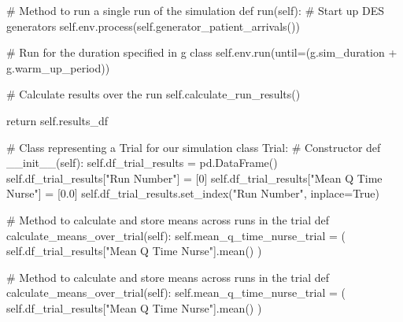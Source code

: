 \documentclass[
  letterpaper,
  DIV=11,
  numbers=noendperiod]{scrreprt}
\newenvironment{Shaded}{}{}
\newcommand{\CommentTok}[1]{\textcolor[rgb]{0.42,0.45,0.49}{#1}}
\newcommand{\ControlFlowTok}[1]{\textcolor[rgb]{0.84,0.23,0.29}{#1}}
\newcommand{\DecValTok}[1]{\textcolor[rgb]{0.00,0.36,0.77}{#1}}
\newcommand{\FloatTok}[1]{\textcolor[rgb]{0.00,0.36,0.77}{#1}}
\newcommand{\FunctionTok}[1]{\textcolor[rgb]{0.44,0.26,0.76}{#1}}
\newcommand{\KeywordTok}[1]{\textcolor[rgb]{0.84,0.23,0.29}{#1}}
\newcommand{\NormalTok}[1]{\textcolor[rgb]{0.14,0.16,0.18}{#1}}
\newcommand{\OperatorTok}[1]{\textcolor[rgb]{0.14,0.16,0.18}{#1}}
\newcommand{\StringTok}[1]{\textcolor[rgb]{0.01,0.18,0.38}{#1}}
\newcommand{\VariableTok}[1]{\textcolor[rgb]{0.89,0.38,0.04}{#1}}
\begin{document}
\begin{tcolorbox}
\begin{Shaded}
\begin{Highlighting}[]
    \CommentTok{\# Method to run a single run of the simulation}
    \KeywordTok{def}\NormalTok{ run(}\VariableTok{self}\NormalTok{):}
        \CommentTok{\# Start up DES generators}
        \VariableTok{self}\NormalTok{.env.process(}\VariableTok{self}\NormalTok{.generator\_patient\_arrivals())}

        \CommentTok{\# Run for the duration specified in g class}
        \VariableTok{self}\NormalTok{.env.run(until}\OperatorTok{=}\NormalTok{(g.sim\_duration }\OperatorTok{+}\NormalTok{ g.warm\_up\_period))}

        \CommentTok{\# Calculate results over the run}
        \VariableTok{self}\NormalTok{.calculate\_run\_results()}

        \ControlFlowTok{return} \VariableTok{self}\NormalTok{.results\_df}

\CommentTok{\# Class representing a Trial for our simulation}
\KeywordTok{class}\NormalTok{ Trial:}
    \CommentTok{\# Constructor}
    \KeywordTok{def}  \FunctionTok{\_\_init\_\_}\NormalTok{(}\VariableTok{self}\NormalTok{):}
        \VariableTok{self}\NormalTok{.df\_trial\_results }\OperatorTok{=}\NormalTok{ pd.DataFrame()}
        \VariableTok{self}\NormalTok{.df\_trial\_results[}\StringTok{"Run Number"}\NormalTok{] }\OperatorTok{=}\NormalTok{ [}\DecValTok{0}\NormalTok{]}
        \VariableTok{self}\NormalTok{.df\_trial\_results[}\StringTok{"Mean Q Time Nurse"}\NormalTok{] }\OperatorTok{=}\NormalTok{ [}\FloatTok{0.0}\NormalTok{]}
        \VariableTok{self}\NormalTok{.df\_trial\_results.set\_index(}\StringTok{"Run Number"}\NormalTok{, inplace}\OperatorTok{=}\VariableTok{True}\NormalTok{)}

    \CommentTok{\# Method to calculate and store means across runs in the trial}
    \KeywordTok{def}\NormalTok{ calculate\_means\_over\_trial(}\VariableTok{self}\NormalTok{):}
        \VariableTok{self}\NormalTok{.mean\_q\_time\_nurse\_trial }\OperatorTok{=}\NormalTok{ (}
            \VariableTok{self}\NormalTok{.df\_trial\_results[}\StringTok{"Mean Q Time Nurse"}\NormalTok{].mean()}
\NormalTok{        )}

    \CommentTok{\# Method to calculate and store means across runs in the trial}
    \KeywordTok{def}\NormalTok{ calculate\_means\_over\_trial(}\VariableTok{self}\NormalTok{):}
        \VariableTok{self}\NormalTok{.mean\_q\_time\_nurse\_trial }\OperatorTok{=}\NormalTok{ (}
            \VariableTok{self}\NormalTok{.df\_trial\_results[}\StringTok{"Mean Q Time Nurse"}\NormalTok{].mean()}
\NormalTok{        )}


\end{Highlighting}
\end{Shaded}
\end{tcolorbox}
\end{document}
